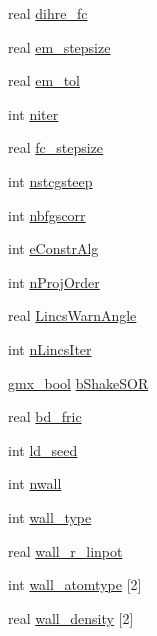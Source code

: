\begin{DoxyCompactItemize}
\item 
real \hyperlink{structt__inputrec_a38352d2c1909cd89f6403d17670612ac}{dihre\-\_\-fc}
\item 
real \hyperlink{structt__inputrec_a89c76b1732255306592e9bc2359330c9}{em\-\_\-stepsize}
\item 
real \hyperlink{structt__inputrec_a832167aea8778cf70deb6f656e08a717}{em\-\_\-tol}
\item 
int \hyperlink{structt__inputrec_ab42b07bb85ffa351f3ee3408c18339b2}{niter}
\item 
real \hyperlink{structt__inputrec_a7747df704dee71478f02f7631048cb5b}{fc\-\_\-stepsize}
\item 
int \hyperlink{structt__inputrec_af544dbdd00b5a96fd7f0b5edc082e4ac}{nstcgsteep}
\item 
int \hyperlink{structt__inputrec_a8e2d33c2fb0f891034f1b5d49ea7c8b0}{nbfgscorr}
\item 
int \hyperlink{structt__inputrec_a5a7014bf96871b5128369902ae67396e}{e\-Constr\-Alg}
\item 
int \hyperlink{structt__inputrec_a8decf6c07ea2e6284e8e58ac395f09ea}{n\-Proj\-Order}
\item 
real \hyperlink{structt__inputrec_ac91e4315899daa6f4ad49bb9f229119d}{\-Lincs\-Warn\-Angle}
\item 
int \hyperlink{structt__inputrec_a434623464f2b60784334fa6ab6580ba5}{n\-Lincs\-Iter}
\item 
\hyperlink{include_2types_2simple_8h_a8fddad319f226e856400d190198d5151}{gmx\-\_\-bool} \hyperlink{structt__inputrec_a59c391779142d8a4a5a54829484bbfba}{b\-Shake\-S\-O\-R}
\item 
real \hyperlink{structt__inputrec_aafbe3194a78549bcaa06ebe4f83b4cef}{bd\-\_\-fric}
\item 
int \hyperlink{structt__inputrec_a04648e0d7540204f389b26f00891ce8c}{ld\-\_\-seed}
\item 
int \hyperlink{structt__inputrec_af382f9b3545a1cd9107eec831e83db9e}{nwall}
\item 
int \hyperlink{structt__inputrec_abf6f03c4c489f1308d2c9941ce2611f0}{wall\-\_\-type}
\item 
real \hyperlink{structt__inputrec_a91f3df420ba679c1ecf7a6b0ddd653e5}{wall\-\_\-r\-\_\-linpot}
\item 
int \hyperlink{structt__inputrec_a3510178fc10370ee327a9a08825141f8}{wall\-\_\-atomtype} \mbox{[}2\mbox{]}
\item 
real \hyperlink{structt__inputrec_a9ea48195d9f670b0c19b00224ff572e6}{wall\-\_\-density} \mbox{[}2\mbox{]}

\end{DoxyCompactItemize}
